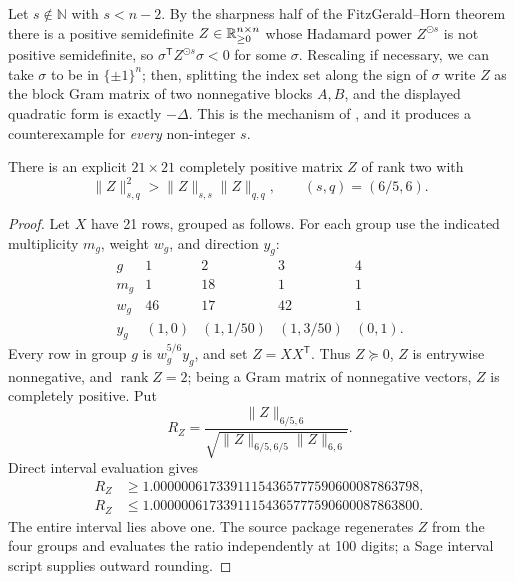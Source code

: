 \begin{cxrefutation}
\begin{remark}\label{rmk:fh}
Let $s\notin\mathbb N$ with $s<n-2$.  By the sharpness half of the FitzGerald--Horn theorem \citep{FitzGeraldHorn1977} there is a positive semidefinite $Z\in\mathbb R_{\ge0}^{n\times n}$ whose Hadamard power $Z^{\odot s}$ is not positive semidefinite, so $\sigma^{\mathsf T}Z^{\odot s}\sigma<0$ for some $\sigma$.  Rescaling if necessary, we can take  $\sigma$ to be in $\{\pm1\}^n$; then, splitting the index set along the sign of $\sigma$ write $Z$ as the block Gram matrix of two nonnegative blocks $A,B$, and the displayed quadratic form is exactly $-\Delta$.  This is the mechanism of \citet[Theorem~4.3]{HornMathias1990}, and it produces a counterexample for \emph{every} non-integer $s$. %
\end{remark}


\begin{theorem}[\statusfalse; computer-assisted disproof $A=B$ case]\label{thm:mixed}
There is an explicit $21\times21$ completely positive matrix $Z$ of rank two with
\[
\|Z\|_{s,q}^2>\|Z\|_{s,s}\|Z\|_{q,q},\qquad (s,q)=(6/5,6).
\]
\end{theorem}
\begin{proof}
Let $X$ have 21 rows, grouped as follows.  For each group use the indicated multiplicity $m_g$, weight $w_g$, and direction $y_g$:
\[
\begin{array}{c|cccc}
g&1&2&3&4\\ \hline
m_g&1&18&1&1\\
w_g&46&17&42&1\\
y_g&(1,0)&(1,1/50)&(1,3/50)&(0,1).
\end{array}
\]
Every row in group $g$ is $w_g^{5/6}y_g$, and set $Z=XX^{\mathsf T}$.  Thus $Z\succeq0$, $Z$ is entrywise nonnegative, and $\operatorname{rank}Z=2$; being a Gram matrix of nonnegative vectors, $Z$ is completely positive.  Put
\[
R_Z=\frac{\|Z\|_{6/5,6}}
{\sqrt{\|Z\|_{6/5,6/5}\|Z\|_{6,6}}}.
\]
Direct interval evaluation gives
\begin{align*}
R_Z&\ge 1.00000061733911154365777590600087863798,\\
R_Z&\le 1.00000061733911154365777590600087863800.
\end{align*}
The entire interval lies above one.  The source package regenerates $Z$ from the four groups and evaluates the ratio independently at 100 digits; a Sage interval script supplies outward rounding.
\end{proof}


\end{cxrefutation}
